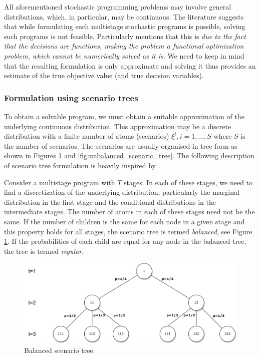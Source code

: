 All aforementioned stochastic programming problems may involve general distributions, which, in particular, may be continuous. The literature suggests that while formulating such multistage stochastic programs is possible, solving such programs is not feasible. Particularly \cite{pflugscenariotreegeneration} mentions that this is \textit{due to the fact that the decisions are functions, making the problem a functional optimization problem, which cannot be numerically solved as it is}. We need to keep in mind that the resulting formulation is only approximate and solving it thus provides an estimate of the true objective value (and true decision variables).
\subsubsection{Formulation using scenario trees}
To obtain a solvable program, we must obtain a suitable approximation of the underlying continuous distribution. This approximation may be a discrete distribution with a finite number of atoms (scenarios) $\xi^i, i=1,\dots,S$ where $S$ is the number of scenarios. The scenarios are usually organised in tree form as shown in Figures \ref{fig:balanced_scenario_tree} and \ref{fig:unbalanced_scenario_tree}. The following description of scenario tree formulation is heavily inspired by \cite[Section 2]{dupacova_scenarios_for_multistage_stochastic_programs}.

Consider a multistage program with $T$ stages. In each of these stages, we need to find a discretization of the underlying distribution, particularly the marginal distribution in the first stage and the conditional distributions in the intermediate stages. The number of atoms in each of these stages need not be the same. If the number of children is the same for each node in a given stage and this property holds for all stages, the scenario tree is termed \textit{balanced}, see Figure \ref{fig:balanced_scenario_tree}. If the probabilities of each child are equal for any node in the balanced tree, the tree is termed \textit{regular}. 

\begin{figure}
  \includegraphics[width=\linewidth]{../img/scenario_tree_balanced.pdf}
  \caption{Balanced scenario tree.}
  \label{fig:balanced_scenario_tree}
\end{figure}


